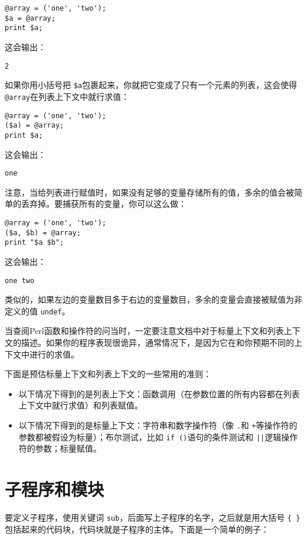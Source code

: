 \begin{lstlisting}
@array = ('one', 'two');
$a = @array;
print $a;
\end{lstlisting}

这会输出：

\begin{lstlisting}
2
\end{lstlisting}

如果你用小括号把 \verb|$a|包裹起来，你就把它变成了只有一个元素的列表，这会使得 \verb|@array|在列表上下文中就行求值：

\begin{lstlisting}
@array = ('one', 'two');
($a) = @array;
print $a;
\end{lstlisting}

这会输出：

\begin{lstlisting}
one
\end{lstlisting}

注意，当给列表进行赋值时，如果没有足够的变量存储所有的值，多余的值会被简单的丢弃掉。要捕获所有的变量，你可以这么做：

\begin{lstlisting}
@array = ('one', 'two');
($a, $b) = @array;
print "$a $b";
\end{lstlisting}

这会输出：

\begin{lstlisting}
one two
\end{lstlisting}

类似的，如果左边的变量数目多于右边的变量数目，多余的变量会直接被赋值为非定义的值 \verb|undef|。

当查阅Perl函数和操作符的问当时，一定要注意文档中对于标量上下文和列表上下文的描述。如果你的程序表现很诡异，通常情况下，是因为它在和你预期不同的上下文中进行的求值。

下面是预估标量上下文和列表上下文的一些常用的准则：

\begin{itemize}
  \item 以下情况下得到的是列表上下文：函数调用（在参数位置的所有内容都在列表上下文中就行求值）和列表赋值。
  \item 以下情况下得到的是标量上下文：字符串和数字操作符（像 \verb|.|和 \verb|+|等操作符的参数都被假设为标量）；布尔测试，比如 \verb|if ()|语句的条件测试和 \verb=||=逻辑操作符的参数；标量赋值。
\end{itemize}

\section{子程序和模块}
要定义子程序，使用关键词 \verb|sub|，后面写上子程序的名字，之后就是用大括号 \verb|{ }|包括起来的代码块，代码块就是子程序的主体。下面是一个简单的例子：

